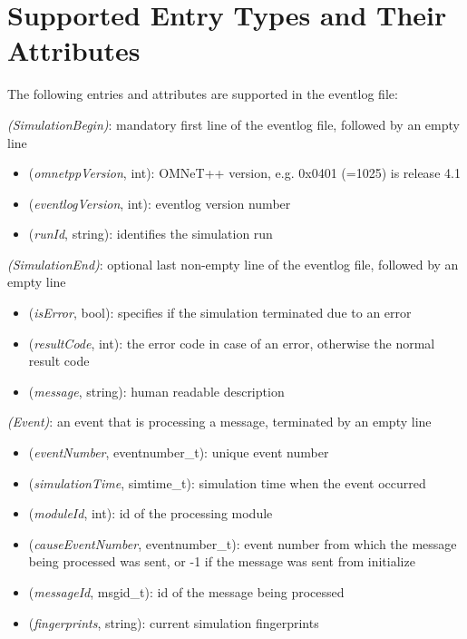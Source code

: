 \section{Supported Entry Types and Their Attributes}
\label{sec:eventlog-file-format:entry-types}

The following entries and attributes are supported in the eventlog file:


 \textit{(SimulationBegin)}: mandatory first line of the eventlog file, followed by an empty line

\begin{itemize}
  \item {} (\textit{omnetppVersion}, int): OMNeT++ version, e.g. 0x0401 (=1025) is release 4.1
  \item {} (\textit{eventlogVersion}, int): eventlog version number
  \item {} (\textit{runId}, string): identifies the simulation run
\end{itemize}

 \textit{(SimulationEnd)}: optional last non-empty line of the eventlog file, followed by an empty line

\begin{itemize}
  \item {} (\textit{isError}, bool): specifies if the simulation terminated due to an error
  \item {} (\textit{resultCode}, int): the error code in case of an error, otherwise the normal result code
  \item {} (\textit{message}, string): human readable description
\end{itemize}

 \textit{(Event)}: an event that is processing a message, terminated by an empty line

\begin{itemize}
  \item \tbf{\#} (\textit{eventNumber}, eventnumber\_t): unique event number
  \item {} (\textit{simulationTime}, simtime\_t): simulation time when the event occurred
  \item {} (\textit{moduleId}, int): id of the processing module
  \item {} (\textit{causeEventNumber}, eventnumber\_t): event number from which the message being processed was sent, or -1 if the message was sent from initialize
  \item {} (\textit{messageId}, msgid\_t): id of the message being processed
  \item {} (\textit{fingerprints}, string): current simulation fingerprints
\end{itemize}


